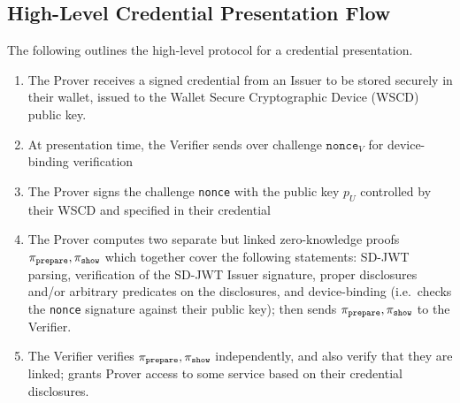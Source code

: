 

\subsection{High-Level Credential Presentation Flow}\label{sec:high-level-flow}

The following outlines the high-level protocol for a credential presentation.

\begin{enumerate}
\item The Prover receives a signed credential from an Issuer to be stored securely in their wallet, issued to the Wallet Secure Cryptographic Device (WSCD) public key.
\item At presentation time, the Verifier sends over challenge $\texttt{nonce}_V$ for device-binding verification
\item The Prover signs the challenge \texttt{nonce} with the public key $p_U$ controlled by their WSCD and specified in their credential
\item The Prover computes two separate but linked zero-knowledge proofs $\pi_{\text{\texttt{prepare}}}, \pi_{\text{\texttt{show}}}$ which together cover the following statements: SD-JWT parsing, verification of the SD-JWT Issuer signature, 
proper disclosures and/or arbitrary predicates on the disclosures, and device-binding 
(i.e.\ checks the \texttt{nonce} signature against their public key); then sends $\pi_{\text{\texttt{prepare}}}, \pi_{\text{\texttt{show}}}$ to the Verifier.
\item The Verifier verifies $\pi_{\text{\texttt{prepare}}}, \pi_{\text{\texttt{show}}}$ independently, and also verify that they are linked; grants Prover access to some service based on their credential disclosures.
\end{enumerate}

